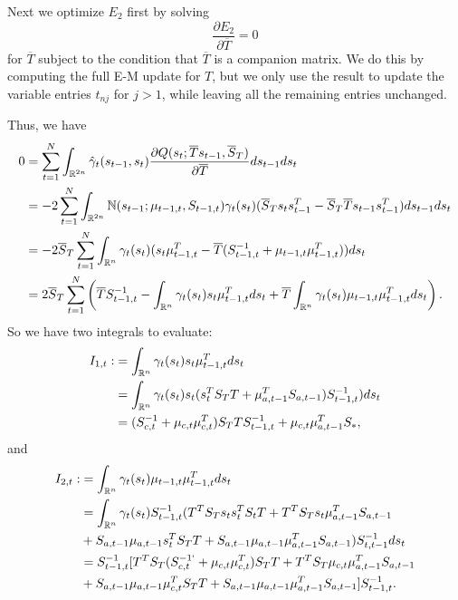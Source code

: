 \documentclass[12pt,leqno]{article}
\begin{document}
Next we optimize $E_2$ first by solving
$$
\frac{\partial{E_2}}{\partial{\overline{T}}} = 0
$$
for $\overline{T}$ subject to the condition that $\overline{T}$ is a companion matrix.  We do this
by computing the full E-M update for $T$, but we only use the result to update the variable entries
$t_{nj}$ for $j > 1$, while leaving all the remaining entries unchanged.

Thus, we have
\begin{equation}\label{T:1}
  \begin{split}
0 &= \sum_{t=1}^N\int_{{\mathbb R}^{2n}}\hat{\gamma}_t(s_{t-1},s_t)
\frac{\partial{Q(s_t;\overline{T}s_{t-1},\overline{S}_T)}}{\partial\overline{T}}ds_{t-1}ds_t \\
&= -2\sum_{t=1}^N\int_{{\mathbb R}^{2n}}{\mathbb N}(s_{t-1};\mu_{t-1,t},S_{t-1,t})\gamma_t(s_t)(\overline{S}_Ts_ts_{t-1}^T -
\overline{S}_T\overline{T}s_{t-1}s_{t-1}^T) ds_{t-1}ds_t \\
&= -2\overline{S}_T\sum_{t=1}^N\int_{{\mathbb R}^{n}}\gamma_t(s_t) (s_t\mu_{t-1,t}^T -
\overline{T}(S_{t-1,t}^{-1} + \mu_{t-1,t}\mu_{t-1,t}^T))ds_t \\
&= 2\overline{S}_T\sum_{t=1}^N\left(\overline{T}S_{t-1,t}^{-1} - \int_{{\mathbb R}^n}\gamma_t(s_t)s_t\mu_{t-1,t}^Tds_t +
\overline{T}\int_{{\mathbb R}^n}\gamma_t(s_t)\mu_{t-1,t}\mu_{t-1,t}^Tds_t\right).\\
  \end{split}
\end{equation}
So we have two integrals to evaluate:
\begin{equation}\label{I_1}
  \begin{split}
  I_{1,t} :&= \int_{{\mathbb R}^n}\gamma_t(s_t)s_t\mu_{t-1,t}^Tds_t \\
  &= \int_{{\mathbb R}^n}\gamma_t(s_t)s_t(s_t^TS_TT + \mu_{a,t-1}^TS_{a,t-1})S_{t-1,t}^{-1})ds_t \\
  &= (S_{c,t}^{-1} + \mu_{c,t}\mu_{c,t}^T)S_TTS_{t-1,t}^{-1} + \mu_{c,t}\mu_{a,t-1}^TS_*,
  \end{split}
  \end{equation}
and
\begin{equation}\label{I_2}
  \begin{split}
  I_{2,t} :&= \int_{{\mathbb R}^n}\gamma_t(s_t)\mu_{t-1,t}\mu_{t-1,t}^Tds_t \\
  &= \int_{{\mathbb R}^n}\gamma_t(s_t)S_{t-1,t}^{-1}(T^TS_Ts_ts_t^TS_tT + T^TS_Ts_t\mu_{a,t-1}^TS_{a,t-1} \\
  &+ S_{a,t-1}\mu_{a,t-1}s_t^TS_TT + S_{a,t-1}\mu_{a,t-1}\mu_{a,t-1}^TS_{a,t-1}) S_{t,t-1}^{-1}ds_t \\
  &= S_{t-1,t}^{-1}[T^TS_T(S_{c,t}^{-1`}+\mu_{c,t}\mu_{c,t}^T)S_TT + T^TS_T\mu_{c,t}\mu_{a,t-1}^TS_{a,t-1} \\
  &+ S_{a,t-1}\mu_{a,t-1}\mu_{c,t}^TS_TT + S_{a,t-1}\mu_{a,t-1}\mu_{a,t-1}^TS_{a,t-1}]S_{t-1,t}^{-1}. \\
\end{split}
\end{equation}
\end{document}
